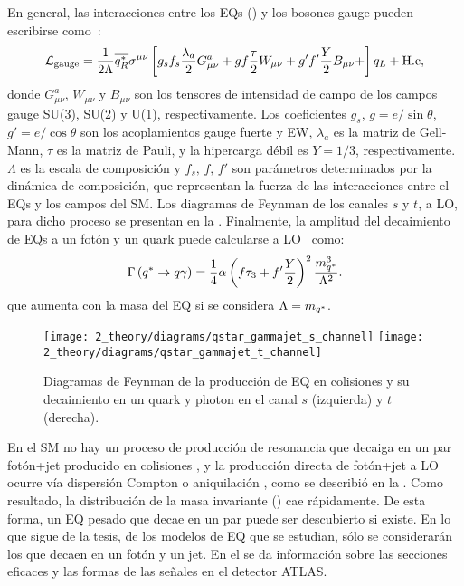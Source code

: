 En general, las interacciones entre los \acp{EQ} (\qstar) y los bosones gauge pueden escribirse como~\cite{Zhan_Li_Liu_Li-2016}:
\begin{equation}
    \mathcal{L}_{\text{gauge}} = 
    \frac{1}{2\Lambda}
    \overline{q^{*}_R}
    \sigma^{\mu\nu}
    \left[
        g_s f_s \frac{\lambda_a}{2} G_{\mu\nu}^a +
        g f \frac{\tau}{2} W_{\mu\nu} +
        g' f' \frac{Y}{2} B_{\mu\nu} +
    \right]
    q_L
    + \text{H.c},
\end{equation}
donde \(G_{\mu\nu}^a\), \(W_{\mu\nu}\) y \(B_{\mu\nu}\) son los tensores de intensidad de campo de los campos gauge SU(3), SU(2) y U(1), respectivamente. Los coeficientes \(g_s\), \(g = e / \sin \theta\), \(g' = e / \cos \theta\) son los acoplamientos gauge fuerte y \ac{EW}, \(\lambda_a\) es la matriz de Gell-Mann, \(\tau\) es la matriz de Pauli, y la hipercarga débil es \(Y = 1/3\), respectivamente. \(\Lambda\) es la escala de composición y \(f_s, \, f, \, f'\) son parámetros determinados por la dinámica de composición, que representan la fuerza de las interacciones entre el \acp{EQ} y los campos del \ac{SM}. Los diagramas de Feynman de los canales \(s\) y \(t\), a \ac{LO}, para dicho proceso se presentan en la \Fig{\ref{fig:theory:bsm:diagrams}}. Finalmente, la amplitud del decaimiento de \acp{EQ} a un fotón y un quark puede calcularse a \ac{LO}~\cite{Zhan_Li_Liu_Li-2016} como:
\begin{equation}
    \Gamma\left(q^{*} \rightarrow q \gamma\right) =
    \frac{1}{4}
    \alpha
    \left(f \tau_3 + f' \frac{Y}{2}\right)^2
    \frac{m_{q^*}^3}{\Lambda^2}.
\end{equation}
que aumenta con la masa \mq del \ac{EQ} si se considera \(\Lambda = m_{q^*}\).


\begin{figure}[ht!]
    \centering
    \texttt{[image: 2\_theory/diagrams/qstar\_gammajet\_s\_channel]}
    \hspace{1cm}
    \texttt{[image: 2\_theory/diagrams/qstar\_gammajet\_t\_channel]}
    \caption{Diagramas de Feynman de la producci\'on de \ac{EQ} en colisiones \pp y su decaimiento en un quark y photon en el canal \(s\) (izquierda) y \(t\) (derecha).}
    \label{fig:theory:bsm:diagrams}
\end{figure}


En el \ac{SM} no hay un proceso de producción de resonancia que decaiga en un par fotón+jet producido en colisiones \pp, y la producción directa de fotón+jet a \ac{LO} ocurre vía dispersión Compton o aniquilación \qqbar, como se describi\'o en la \Sect{\ref{subsec:theory:sm:prompt_photon}}. Como resultado, la distribución de la masa invariante \gammajet (\myj) cae rápidamente. De esta forma, un \ac{EQ} pesado que decae en un par \gammajet puede ser descubierto si existe. En lo que sigue de la tesis, de los modelos de \ac{EQ} que se estudian, s\'olo se considerar\'an los que decaen en un fot\'on y un jet. En el  se da información sobre las secciones eficaces y las formas de las señales en el detector \ac{ATLAS}.

